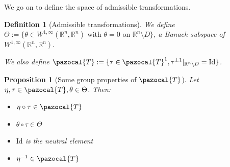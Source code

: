 \documentclass[english,a4paper,9pt,oneside]{scrbook}	%
\theoremstyle{break}
\newtheorem{defn}[equation]{Definition}
\newtheorem{prop}[equation]{Proposition}
\newenvironment{mproof}[1][\proofname]{%
  \begin{proof}[#1]$ $\par\nobreak\ignorespaces
}{%
  \end{proof}
}
\renewcommand*{\proofname}{Proof}
\theoremstyle{remark}
\newcommand{\mR}{\mathbb{R}}
\newcommand{\cV}{\pazocal{V}}
\newcommand{\cT}{\pazocal{T}}
\newcommand{\id}{\text{Id}}
\newcommand{\te}{\theta}
\newcommand{\Te}{\Theta}
\begin{document}
\begin{appendices}
We go on to define the space of admissible transformations.

\begin{defn}[Admissible transformations]
\label{def:adm}
We define $\Theta:=\{\theta \in W^{1,\infty}(\mR^n,\mR^n) \text{ with } \theta=0 \text{ on } \mR^n \setminus D\}$, a Banach subspace of $ W^{1,\infty}(\mR^n,\mR^n)$.


We also define $\cT:=\{\tau \in \cT^1, \tau^{\pm 1}|_{\mR^n\setminus D}=\id\}$. 

\end{defn}

\begin{prop}[Some group properties of $\cT$]
\label{prop:group}
Let $\eta, \tau \in \cT, \te \in \Te$. Then:

\begin{itemize}
	\item $\eta \circ \tau \in \cT$
	\item $\te \circ \tau \in \Te$
	\item $\id$ is the neutral element
	\item $\eta^{-1} \in \cT$
\end{itemize}

\end{prop}
%
%
%
%
%
%


\end{appendices}
\end{document}

